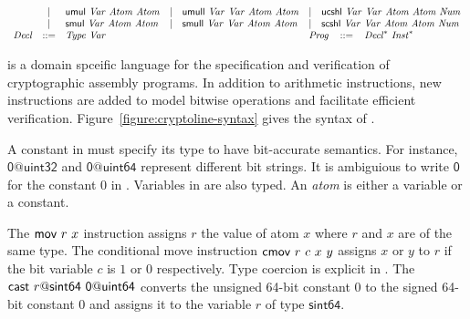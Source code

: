 \begin{figure*}
\begin{math}
\begin{array}{rclclcl}
      & | & \clUMul\ \mathit{Var}\ \mathit{Atom}\ \mathit{Atom}
      & | & \clUMull\ \mathit{Var}\ \mathit{Var}\
            \mathit{Atom}\ \mathit{Atom}
      & | & \clUCShl\ \mathit{Var}\ \mathit{Var}\
            \mathit{Atom}\ \mathit{Atom}\ \mathit{Num}\\
      & | & \clSMul\ \mathit{Var}\ \mathit{Atom}\ \mathit{Atom}
      & | & \clSMull\ \mathit{Var}\ \mathit{Var}\
            \mathit{Atom}\ \mathit{Atom}
      & | & \clSCShl\ \mathit{Var}\ \mathit{Var}\
            \mathit{Atom}\ \mathit{Atom}\ \mathit{Num}\\
      \mathit{Decl} & ::= &
        \multicolumn{2}{l}{\mathit{Type}\ \mathit{Var}}
      &&
      \multicolumn{2}{l}{
         \mathit{Prog} \hspace{2ex} ::=\hspace{2ex}
         \mathit{Decl}^*\ \mathit{Inst}^*
      }
    \end{array}
  \end{math}
  \caption{\cryptoline Syntax}
  \label{figure:cryptoline-syntax}
\end{figure*}

\cryptoline is a domain spceific language for the specification and
verification of cryptographic assembly programs. In addition to
arithmetic instructions, new instructions are added to model bitwise
operations and facilitate efficient verification.
Figure~\ref{figure:cryptoline-syntax} gives the syntax of \cryptoline.

A constant in \cryptoline must specify its type to have bit-accurate
semantics. For instance, $\mathsf{0@uint32}$ and $\mathsf{0@uint64}$
represent different bit strings. It is ambiguious to write
$\mathsf{0}$ for the constant $0$ in \cryptoline. Variables in
\cryptoline are also typed. An \emph{atom} is either a variable or a
constant.

The $\textsf{mov}\ r\ x$ instruction assigns $r$ the value of atom $x$ where
$r$ and $x$ are of the same type. The conditional move instruction
$\textsf{cmov}\ r\ c\ x\ y$ assigns $x$ or $y$ to $r$ if the bit variable
$c$ is $1$ or $0$ respectively. Type coercion is explicit in
\cryptoline. The $\clVPCast\ r\mathsf{@sint64}\ \mathsf{0@uint64}$
converts the unsigned 64-bit constant $0$ to the signed 64-bit
constant $0$ and assigns it to the variable $r$ of type $\mathsf{sint64}$.

